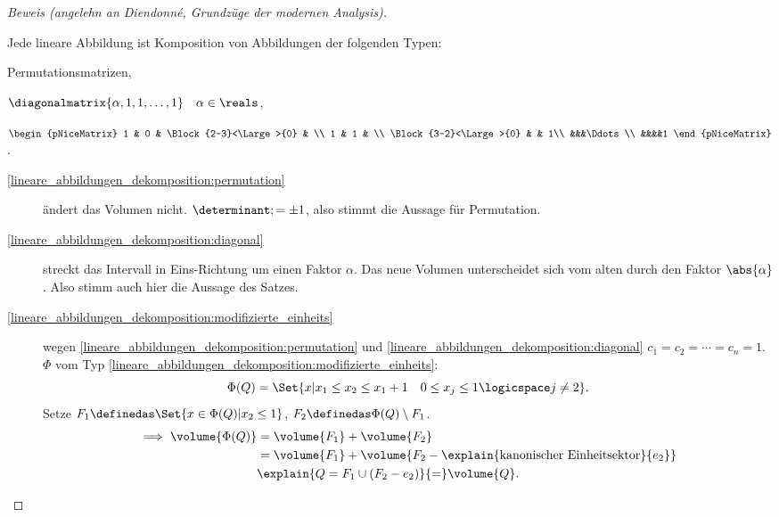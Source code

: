 \begin{proof}[Beweis (angelehn an Diendonné, Grundzüge der modernen Analysis)]
\begin{subproof}
    Jede lineare Abbildung ist Komposition von Abbildungen der folgenden Typen:
    \begin{eigenschaftenenumerate}
      \item \label{lineare_abbildungen_dekomposition:permutation}Permutationsmatrizen,
      \item \label{lineare_abbildungen_dekomposition:diagonal}\( \diagonalmatrix{\alpha,1,1,\dotsc,1}\quad \alpha\in \reals \),
      \item \label{lineare_abbildungen_dekomposition:modifizierte_einheits}\( \begin{pNiceMatrix} 1 & 0 & \Block{2-3}<\Large>{0} &  \\ 1 & 1 &  \\  \Block{3-2}<\Large>{0} &  & 1\\
      &&&\Ddots\\
    &&&&1 \end{pNiceMatrix} \).
    \end{eigenschaftenenumerate}
    \begin{description}
      \item[\ref{lineare_abbildungen_dekomposition:permutation}] ändert das Volumen nicht. \( \determinant;=\pm 1 \), also stimmt die Aussage für Permutation.
      \item[\ref{lineare_abbildungen_dekomposition:diagonal}] streckt das Intervall in Eins-Richtung um einen Faktor \( \alpha \). Das neue Volumen unterscheidet sich vom alten durch den Faktor \( \abs{\alpha} \). Also stimm auch hier die Aussage des Satzes.
      \item[\ref{lineare_abbildungen_dekomposition:modifizierte_einheits}] wegen \ref{lineare_abbildungen_dekomposition:permutation} und \ref{lineare_abbildungen_dekomposition:diagonal} \obda \( c_1=c_2=\dotsb=c_n=1 \). \( \Phi \) vom Typ \ref{lineare_abbildungen_dekomposition:modifizierte_einheits}: 
      \begin{equation*}
        \Phi(Q)=\Set{x|x_1\leq x_2\leq x_1+1\quad 0\leq x_j\leq 1\logicspace j\neq 2}.
      \end{equation*}
      Setze \( F_1\definedas \Set{x\in \Phi(Q)|x_2\leq 1} \), \( F_2\definedas \Phi(Q)\setminus F_1 \).
      \begin{align*}
        \implies \volume{\Phi(Q)}&=\volume{F_1}+\volume{F_2}\\
        &=\volume{F_1}+\volume{F_2-\explain{\text{kanonischer Einheitsektor}}{e_2}}\\
        &\explain{Q=F_1\cup (F_2-e_2)}{=}\volume{Q}.
      \end{align*}

\end{description}
\end{subproof}
\end{proof}
